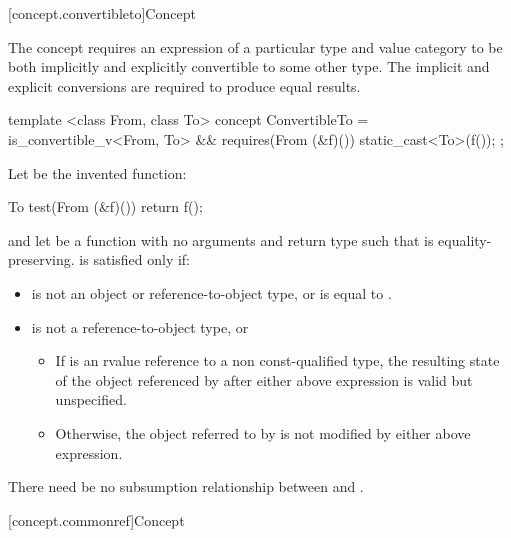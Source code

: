 [concept.convertibleto]{Concept }

\pnum
The  concept requires an expression of a particular
type and value category to be both implicitly and explicitly convertible to some
other type. The implicit and explicit conversions are required to produce equal
results.

%
\begin{itemdecl}
template <class From, class To>
concept ConvertibleTo = is_convertible_v<From, To> &&
  requires(From (&f)()) { static_cast<To>(f()); };
\end{itemdecl}

\begin{itemdescr}
\pnum
Let  be the invented function:
\begin{codeblock}
To test(From (&f)()) {
  return f();
}
\end{codeblock}
and let  be a function with no arguments and return type 
such that  is equality-preserving.
 is satisfied only if:

\begin{itemize}
\item
{} is not an object or reference-to-object type, or
 is equal to .

\item
{} is not a reference-to-object type, or

\begin{itemize}
\item
If  is an rvalue reference to a non const-qualified type, the
resulting state of the object referenced by  after either above
expression is valid but unspecified.

\item
Otherwise, the object referred to by  is not modified by either above
expression.
\end{itemize}

\end{itemize}

\pnum
There need be no subsumption relationship between
and
.
\end{itemdescr}


[concept.commonref]{Concept }

